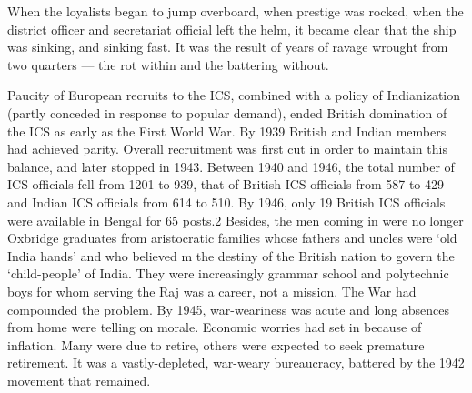 When the loyalists began to jump overboard, when prestige was rocked, when the district officer and secretariat official left the helm, it became clear that the ship was sinking, and sinking fast. It was the result of years of ravage wrought from two quarters --- the rot within and the battering without. 

Paucity of European recruits to the ICS, combined with a policy of Indianization (partly conceded in response to popular demand), ended British domination of the ICS as early as the First World War. By 1939 British and Indian members had achieved parity. Overall recruitment was first cut in order to maintain this balance, and later stopped in 1943. Between 1940 and 1946, the total number of ICS officials fell from 1201 to 939, that of British ICS officials from 587 to 429 and Indian ICS officials from 614 to 510. By 1946, only 19 British ICS officials were available in Bengal for 65 posts.2 Besides, the men coming in were no longer Oxbridge graduates from aristocratic families whose fathers and uncles were `old India hands' and who believed m the destiny of the British nation to govern the `child-people' of India. They were increasingly grammar school and polytechnic boys for whom serving the Raj was a career, not a mission. The War had compounded the problem. By 1945, war-weariness was acute and long absences from home were telling on morale. Economic worries had set in because of inflation. Many were due to retire, others were expected to seek premature retirement. It was a vastly-depleted, war-weary bureaucracy, battered by the 1942 movement that remained. 

